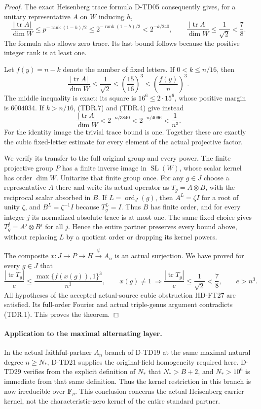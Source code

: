 \begin{proof}
The exact Heisenberg trace formula D-TD05 consequently gives, for
a unitary representative $A$ on $W$ inducing $h$,
\[
 \frac{|\operatorname{tr}A|}{\dim W}
 \le p^{-\operatorname{rank}(1-h)/2}
 \le 2^{-\operatorname{rank}(1-h)/2}
 <2^{-k/240},\qquad
 \frac{|\operatorname{tr}A|}{\dim W}\le\frac1{\sqrt2}<\frac78.
 \tag{TDR.7}
\]
The formula also allows zero trace. Its last bound follows because
the positive integer rank is at least one.

Let $f(y)=n-k$ denote the number of fixed letters. If
$0<k\le n/16$, then
\[
 \frac{|\operatorname{tr}A|}{\dim W}
 \le\frac1{\sqrt2}\le\left(\frac{15}{16}\right)^3
 \le\left(\frac{f(y)}n\right)^3.
 \tag{TDR.8}
\]
The middle inequality is exact: its square is
$16^6\le2\cdot15^6$, whose positive margin is $6004034$.
If $k>n/16$, (TDR.7) and (TDR.4) give instead
\[
 \frac{|\operatorname{tr}A|}{\dim W}
       <2^{-n/3840}<2^{-n/4096}<\frac1{n^3}.
 \tag{TDR.9}
\]
For the identity image the trivial trace bound is one. Together
these are exactly the cubic fixed-letter estimate for every
element of the actual projective factor.

We verify its transfer to the full original group and every power.
The finite projective group $P$ has a finite inverse image in
$\operatorname{SL}(W)$, whose scalar kernel has order $\dim W$.
Unitarize that finite group once. For any $g\in J$ choose a
representative $A$ there and write its actual operator as
$T_g=A\otimes B$, with the reciprocal scalar absorbed in $B$.
If $L=\operatorname{ord}_J(g)$, then $A^L=\zeta I$ for a root
of unity $\zeta$, and $B^L=\zeta^{-1}I$ because $T_g^L=I$.
Thus $B$ has finite order, and for every integer $j$ its normalized
absolute trace is at most one. The same fixed choice gives
$T_g^j=A^j\otimes B^j$ for all $j$. Hence the entire partner
preserves every bound above, without replacing $L$ by a quotient
order or dropping its kernel powers.

The composite $x:J\to P\to H\xrightarrow{\psi}A_n$ is an
actual surjection. We have proved for every $g\in J$ that
\[
 \frac{|\operatorname{tr}T_g|}{e}
       \le\frac{\max\{f(x(g)),1\}^3}{n^3},\qquad
 x(g)\ne1\ \Longrightarrow
       \frac{|\operatorname{tr}T_g|}{e}\le\frac1{\sqrt2}<\frac78,
 \qquad e>n^3.
 \tag{TDR.10}
\]
All hypotheses of the accepted actual-source cubic obstruction
HD-FT27 are satisfied. Its full-order Fourier and actual triple-genus
argument contradicts (TDR.1). This proves the theorem.
\end{proof}

\paragraph{Application to the maximal alternating layer.}
In the actual faithful-partner $A_n$ branch of D-TD19 at the same
maximal natural degree $n\ge N_*$, D-TD21 supplies the original-field
homogeneity required here. D-TD29 verifies from the explicit
definition of $N_*$ that $N_*>B+2$, and $N_*>10^6$ is immediate
from that same definition. Thus the kernel restriction in this
branch is now irreducible over $\mathbf F_p$.
This conclusion concerns the actual Heisenberg carrier kernel,
not the characteristic-zero kernel of the entire standard partner.

